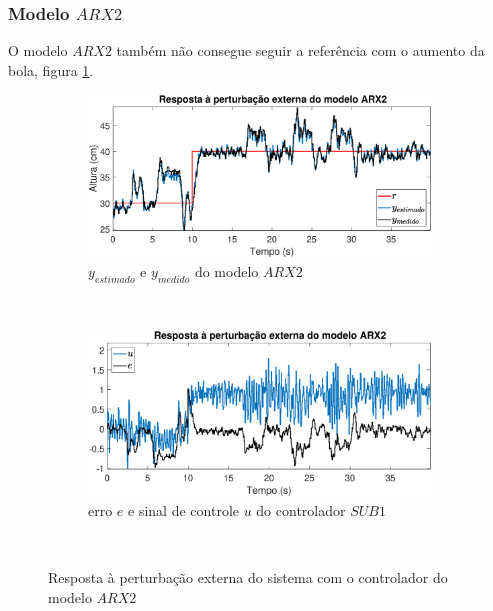 \subsubsection{Modelo $ARX2$}
O modelo $ARX2$ também não consegue seguir a referência com o aumento da bola, figura \ref{fig:pextrarx2y}.
\begin{figure}[htb]
	\centering
	\begin{subfigure}[t]{0.48\textwidth}
		\includegraphics[width=1\linewidth]{pextrarx2y}
		\caption[$y_{estimado}$ e $y_{medido}$ do modelo $ARX2$]{$y_{estimado}$ e $y_{medido}$ do modelo $ARX2$}
		\label{fig:pextrarx2y}
	\end{subfigure}
	~ %
	\begin{subfigure}[t]{0.48\textwidth}
		\includegraphics[width=1\linewidth]{pextrarx2e}
		\caption[erro $e$ e sinal de controle $u$ do controlador $SUB1$]{erro $e$ e sinal de controle $u$ do controlador $SUB1$}
		\label{fig:pextrarx2e}
	\end{subfigure}
	~ %
	
	\caption{Resposta à perturbação externa do sistema com o controlador do modelo $ARX2$}\label{fig:pextrarx2}
\end{figure}

